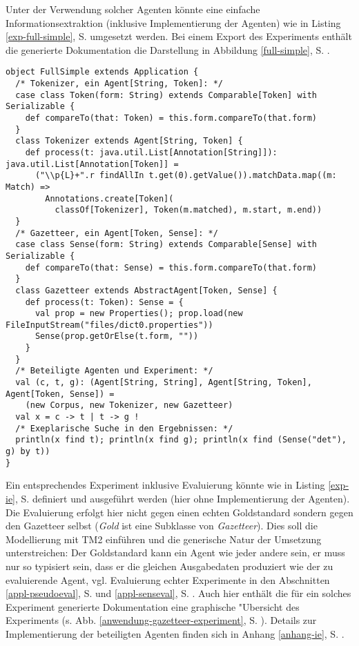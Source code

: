 \documentclass[abstracton, 12pt]{scrartcl}
\begin{document}
Unter der Verwendung solcher Agenten könnte eine einfache Informationsextraktion (inklusive Implementierung der Agenten) wie in Listing \ref{exp-full-simple}, S. \pageref{exp-full-simple} umgesetzt werden. Bei einem Export des Experiments enthält die generierte Dokumentation die Darstellung in Abbildung \ref{full-simple}, S. \pageref{full-simple}.

\begin{lstlisting}[float, label=exp-full-simple, caption={Ein einfaches Experiment zur Informationsextraktion mit TM2 in Scala, inklusive Implementierung von Tokenizer und Gazetteer}]
object FullSimple extends Application {
  /* Tokenizer, ein Agent[String, Token]: */
  case class Token(form: String) extends Comparable[Token] with Serializable {
    def compareTo(that: Token) = this.form.compareTo(that.form)
  }
  class Tokenizer extends Agent[String, Token] {
    def process(t: java.util.List[Annotation[String]]): java.util.List[Annotation[Token]] =
      ("\\p{L}+".r findAllIn t.get(0).getValue()).matchData.map((m: Match) =>
        Annotations.create[Token](
          classOf[Tokenizer], Token(m.matched), m.start, m.end))
  }
  /* Gazetteer, ein Agent[Token, Sense]: */
  case class Sense(form: String) extends Comparable[Sense] with Serializable {
    def compareTo(that: Sense) = this.form.compareTo(that.form)
  }
  class Gazetteer extends AbstractAgent[Token, Sense] {
    def process(t: Token): Sense = {
      val prop = new Properties(); prop.load(new FileInputStream("files/dict0.properties"))
      Sense(prop.getOrElse(t.form, ""))
    }
  }
  /* Beteiligte Agenten und Experiment: */
  val (c, t, g): (Agent[String, String], Agent[String, Token], Agent[Token, Sense]) =
    (new Corpus, new Tokenizer, new Gazetteer)
  val x = c -> t | t -> g !
  /* Exeplarische Suche in den Ergebnissen: */
  println(x find t); println(x find g); println(x find (Sense("det"), g) by t))
}
\end{lstlisting}

Ein entsprechendes Experiment inklusive Evaluierung könnte wie in Listing \ref{exp-ie}, S. \pageref{exp-ie} definiert und ausgeführt werden (hier ohne Implementierung der Agenten). Die Evaluierung erfolgt hier nicht gegen einen echten Goldstandard sondern gegen den Gazetteer selbst (\emph{Gold} ist eine Subklasse von \emph{Gazetteer}). Dies soll die Modellierung mit TM2 einführen und die generische Natur der Umsetzung unterstreichen: Der Goldstandard kann ein Agent wie jeder andere sein, er muss nur so typisiert sein, dass er die gleichen Ausgabedaten produziert wie der zu evaluierende Agent, vgl. Evaluierung echter Experimente in den Abschnitten \ref{appl-pseudoeval}, S. \pageref{appl-pseudoeval} und \ref{appl-senseval}, S. \pageref{appl-senseval}. Auch hier enthält die für ein solches Experiment generierte Dokumentation eine graphische "Ubersicht des Experiments (s. Abb. \ref{anwendung-gazetteer-experiment}, S. \pageref{anwendung-gazetteer-experiment}). Details zur Implementierung der beteiligten Agenten finden sich in Anhang \ref{anhang-ie}, S. \pageref{anhang-ie}.
\end{document}
